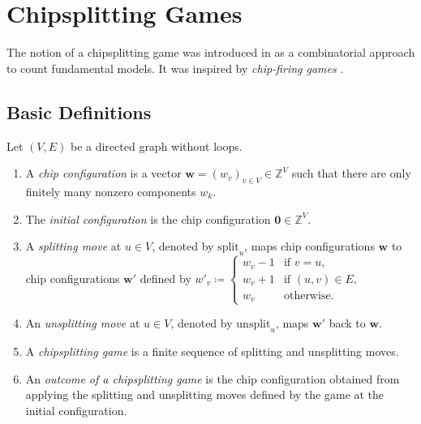 \chapter{Chipsplitting Games}

The notion of a chipsplitting game was introduced in \cite{bik2022classifying} as a combinatorial approach to count fundamental models. It was inspired by \emph{chip-firing games} \cite{klivans2018mathematics}. 

\section{Basic Definitions}

\begin{definition}
    Let $(V,E)$ be a directed graph without loops.

    \begin{enumerate}
        \item A \emph{chip configuration} is a vector \( \mathbf{w} = (w_v)_{v \in V} \in \mathbb{Z}^{V} \) such that there are only finitely many nonzero components \( w_k \).
        \item The \emph{initial configuration} is the chip configuration \( \mathbf 0  \in \mathbb{Z}^V \).
        \item A \emph{splitting move} at \( u \in V \), denoted by \( \mathrm{split}_u \), maps chip configurations \( \mathbf w \) to chip configurations \( \mathbf{w}' \) defined by \( w'_v \coloneqq \begin{cases}
            w_v -1 & \text{if } v = u, \\
            w_v + 1 & \text{if } (u,v) \in E ,\\
            w_v & \text{otherwise}.
        \end{cases} \)
        \item An \emph{unsplitting move} at \( u \in V \), denoted by \( \mathrm{unsplit}_u \), maps \( \mathbf w' \) back to \( \mathbf{w} \). 
        \item A \emph{chipsplitting game} is a finite sequence of splitting and unsplitting moves.
        \item An \emph{outcome of a chipsplitting game} is the chip configuration obtained from applying the splitting and unsplitting moves defined by the game at the initial configuration.
    \end{enumerate}
\end{definition}

